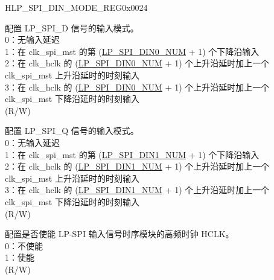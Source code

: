 \begin{register}{H}{LP\_SPI\_DIN\_MODE\_REG}{0x0024}\label{regdesc:LPSPIDINMODEREG}
%
%
%
%
%
%
%
\regnewline%
\begin{regdesc}\begin{reglist}
\label{fielddesc:LPSPIDIN0MODE}\item [LP\_SPI\_DIN0\_MODE] 配置 LP\_SPI\_D 信号的输入模式。\\
0：无输入延迟\\
1：在 clk\_spi\_mst 的第 (\hyperref[fielddesc:LPSPIDIN0NUM]{LP\_SPI\_DIN0\_NUM} + 1) 个下降沿输入\\
2：在 clk\_hclk 的 (\hyperref[fielddesc:LPSPIDIN0NUM]{LP\_SPI\_DIN0\_NUM} + 1) 个上升沿延时加上一个 clk\_spi\_mst 上升沿延时的时刻输入\\
3：在 clk\_hclk 的 (\hyperref[fielddesc:LPSPIDIN0NUM]{LP\_SPI\_DIN0\_NUM} + 1) 个上升沿延时加上一个 clk\_spi\_mst 下降沿延时的时刻输入\\
(R/W)
\label{fielddesc:LPSPIDIN1MODE}\item [LP\_SPI\_DIN1\_MODE] 配置 LP\_SPI\_Q 信号的输入模式。\\
0：无输入延迟\\
1：在 clk\_spi\_mst 的第 (\hyperref[fielddesc:LPSPIDIN1NUM]{LP\_SPI\_DIN1\_NUM} + 1) 个下降沿输入\\
2：在 clk\_hclk 的 (\hyperref[fielddesc:LPSPIDIN1NUM]{LP\_SPI\_DIN1\_NUM} + 1) 个上升沿延时加上一个 clk\_spi\_mst 上升沿延时的时刻输入\\
3：在 clk\_hclk 的 (\hyperref[fielddesc:LPSPIDIN1NUM]{LP\_SPI\_DIN1\_NUM} + 1) 个上升沿延时加上一个 clk\_spi\_mst 下降沿延时的时刻输入\\
(R/W)

\label{fielddesc:LPSPITIMINGHCLKACTIVE}\item [LP\_SPI\_TIMING\_HCLK\_ACTIVE] 配置是否使能 LP-SPI 输入信号时序模块的高频时钟 HCLK。\\
0：不使能\\
1：使能\\
(R/W)
\end{reglist}\end{regdesc}
\end{register}



